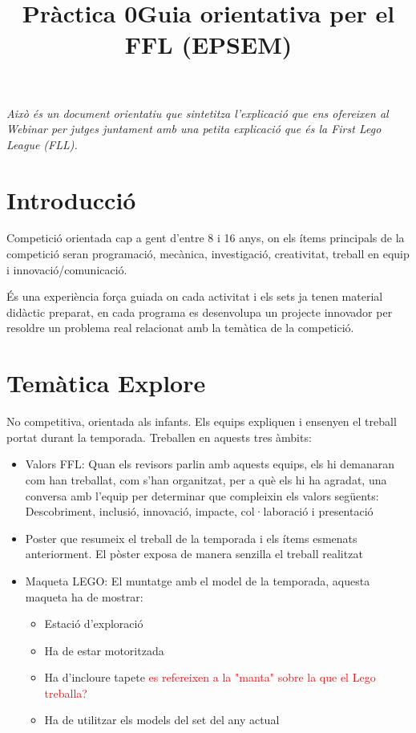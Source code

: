 \documentclass{article}
\title{Pràctica 0}
\newcommand\dubtes[1]{\textcolor{red}{#1}}
\begin{document}
\title{Guia orientativa per el FFL (EPSEM)}

\hfill
\textit{Això és un document orientatiu que sintetitza l'explicació que ens ofereixen al Webinar per jutges\cite{Webinar} juntament amb una petita explicació que és la First Lego League (FLL)\cite{FFL}.}
\hfill 

\section{Introducció}
\hfill

Competició orientada cap a gent d’entre 8 i 16 anys, on els ítems principals de la competició seran programació, mecànica, investigació, creativitat, treball en equip i innovació/comunicació. 

\hfill \break\hfill \break
És una experiència força guiada on cada activitat i els sets ja tenen material didàctic preparat, en cada programa es desenvolupa un projecte innovador per resoldre un problema real relacionat amb la temàtica de la competició.

\section{Temàtica Explore}
No competitiva, orientada als infants. Els equips expliquen i ensenyen el treball portat durant la temporada. Treballen en aquests tres àmbits:

\begin{itemize}
  \item Valors FFL: Quan els revisors parlin amb aquests equips, els hi demanaran com han treballat, com s’han organitzat, per a què els hi ha agradat, una conversa amb l’equip per determinar que compleixin els valors següents: Descobriment, inclusió, innovació, impacte, col·laboració i presentació
  \item Poster que resumeix el treball de la temporada i els ítems esmenats anteriorment. El pòster exposa de manera senzilla el treball realitzat
  \item Maqueta LEGO: El muntatge amb el model de la temporada, aquesta maqueta ha de mostrar:
  \begin{itemize}
    \item Estació d'exploració
    \item Ha de estar motoritzada
    \item Ha d'incloure tapete \dubtes{es refereixen a la "manta" sobre la que el Lego treballa?}
    \item Ha de utilitzar els models del set del any actual
  \end{itemize}
\end{itemize}
\end{document}
